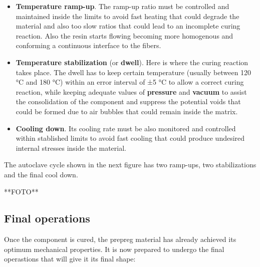 \begin{itemize}
\item \textbf{Temperature ramp-up}. The ramp-up ratio must be controlled and maintained inside the limits to avoid fast heating that could degrade the material and also too slow ratios that could lead to an incomplete curing reaction. Also the resin starts flowing becoming more homogenous and conforming a continuous interface to the fibers.
\item \textbf{Temperature stabilization} (or \textbf{dwell}). Here is where the curing reaction takes place. The dwell has to keep certain temperature (usually between 120 °C and 180 °C) within an error interval of ±5 °C to allow a correct curing reaction, while keeping adequate values of \textbf{pressure} and \textbf{vacuum} to assist the consolidation of the component and suppress the potential voids that could be formed due to air bubbles that could remain inside the matrix.
\item \textbf{Cooling down}. Its cooling rate must be also monitored and controlled within stablished limits to avoid fast cooling that could produce undesired internal stresses inside the material.
\end{itemize}

The autoclave cycle shown in the next figure has two ramp-ups, two stabilizations and the final cool down.

**FOTO**

\subsection{Final operations}

Once the component is cured, the prepreg material has already achieved its optimum mechanical properties. It is now prepared to undergo the final operastions that will give it its final shape:

